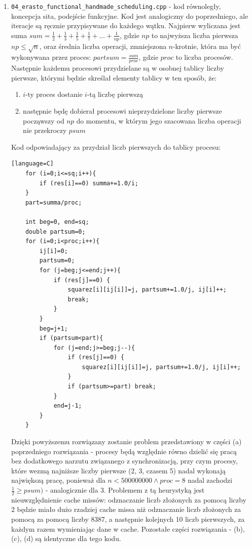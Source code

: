 \documentclass[12pt]{article}
\begin{document}
\begin {enumerate}
\begin{enumerate}
	\end{enumerate}
	\item \texttt{04\_erasto\_functional\_handmade\_scheduling.cpp} - kod równoległy, koncepcja sita, podejście funkcyjne. Kod jest analogiczny do poprzedniego, ale iteracje są ręcznie przypisywane do każdego wątku. Najpierw wyliczana jest suma \(sum=\frac{1}{2}+\frac{1}{3}+\frac{1}{5}+\frac{1}{7}+...+\frac{1}{np}\), gdzie \(np\) to najwyższa liczba pierwsza \(np\le\sqrt{n}\), oraz średnia liczba operacji, zmniejszona \(n\)-krotnie, która ma być wykonywana przez proces: \(partsum=\frac{sum}{proc}\), gdzie \(proc\) to liczba procesów. Następnie każdemu procesowi przydzielane są w osobnej tablicy liczby pierwsze, którymi będzie skreślał elementy tablicy w ten sposób, że:
	\begin{enumerate}
		\item \(i\)-ty proces dostanie \(i\)-tą liczbę pierwszą
		\item następnie będę dobierał procesowi nieprzydzielone liczby pierwsze począwszy od \(np\) do momentu, w którym jego szacowana liczba operacji nie przekroczy \(psum\)
	\end{enumerate}
	Kod odpowiadający za przydział liczb pierwszych do tablicy procesu:
	\begin{lstlisting}[style=mystyle, caption=  Ręczny scheduling sita funkcyjnego][language=C]
	for (i=0;i<=sq;i++){
		if (res[i]==0) summa+=1.0/i;
	}
	part=summa/proc;
	
	int beg=0, end=sq;
	double partsum=0;
	for (i=0;i<proc;i++){
		ij[i]=0;
		partsum=0;
		for (j=beg;j<=end;j++){
			if (res[j]==0) {
				squarez[i][ij[i]]=j, partsum+=1.0/j, ij[i]++;
				break;
			}
		}
		beg=j+1;
		if (partsum<part){
			for (j=end;j>=beg;j--){
				if (res[j]==0) {
					squarez[i][ij[i]]=j, partsum+=1.0/j, ij[i]++;
				}
				if (partsum>=part) break;
			}
			end=j-1;
		}
	}
	\end{lstlisting}
	Dzięki powyższemu rozwiązany zostanie problem przedstawiony w części (a) poprzedniego rozwiązania - procesy będą względnie równo dzielić się pracą bez dodatkowego narzutu związanego z synchronizacją, przy czym procesy, które wezmą najniższe liczby pierwsze (2, 3, czasem 5) nadal wykonają największą pracę, ponieważ dla \(n<500000000 \land proc=8\) nadal zachodzi \(\frac{1}{2}\ge psum)\) - analogicznie dla 3. Problemem z tą heurystyką jest nieuwzględnienie cache missów: odznaczanie liczb złożonych za pomocą liczby 2 będzie miało dużo rzadziej cache missa niż odznaczanie liczb złożonych za pomocą za pomocą liczby 8387, a następnie kolejnych 10 liczb pierwszych, za każdym razem wymieniając dane w cache. Pozostałe części rozwiązania - (b), (c), (d) są identyczne dla tego kodu.
	

\end{enumerate}
\end{document}

